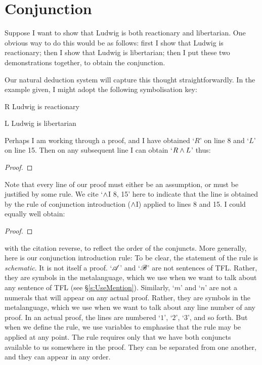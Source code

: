 \section{Conjunction}
Suppose I want to show that Ludwig is both reactionary and libertarian. One obvious way to do this would be as follows: first I show that Ludwig is reactionary; then I show that Ludwig is libertarian; then I put these two demonstrations together, to obtain the conjunction.

Our natural deduction system will capture this thought straightforwardly. In the example given, I might adopt the following symbolisation key:
	\begin{ekey}
		\item[R] Ludwig is reactionary
		\item[L] Ludwig is libertarian
	\end{ekey}
Perhaps I am working through a proof, and I have obtained `$R$' on line 8 and `$L$' on line 15. Then on any subsequent line I can obtain `$R \wedge L$' thus:
\begin{proof}
	 
\end{proof}
Note that every line of our proof must either be an assumption, or must be justified by some rule. We cite `$\wedge$I 8, 15' here to indicate that the line is obtained by the rule of conjunction introduction ($\wedge$I) applied to lines 8 and 15. I could equally well obtain:
\begin{proof}
	 
\end{proof}
with the citation reverse, to reflect the order of the conjuncts. More generally, here is our conjunction introduction rule:
To be clear, the statement of the rule is \emph{schematic}. It is not itself a proof.  `$\mathscr{A}$' and `$\mathscr{B}$' are not sentences of TFL. Rather, they are symbols in the metalanguage, which we use when we want to talk about any sentence of TFL (see \S\ref{s:UseMention}). Similarly, `$m$' and `$n$' are not a numerals that will appear on any actual proof. Rather, they are symbols in the metalanguage, which we use when we want to talk about any line number of any proof. In an actual proof, the lines are numbered `$1$', `$2$', `$3$', and so forth. But when we define the rule, we use variables to emphasise that the rule may be applied at any point. The rule requires only that we have both conjuncts available to us somewhere in the proof. They can be separated from one another, and they can appear in any order. 

